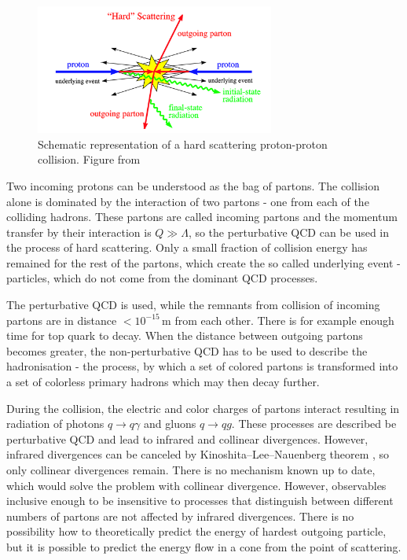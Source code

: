 \begin{figure}[t]
  \centering
  \includegraphics[width=0.7\textwidth]{Chapter2/HardProcess.png}
  \caption{Schematic representation of a hard scattering proton-proton
    collision. Figure from \cite{HardProcess}}
  \label{fig:HardProcess}
\end{figure}

Two incoming protons can be understood as the bag of
partons. The collision alone is dominated by the interaction of two partons - one from
each of the colliding hadrons. These partons are called incoming partons and the
momentum transfer by their interaction is $Q \gg \Lambda$, so the perturbative
QCD can be used in the process of hard scattering. Only a small fraction of
collision energy has remained for the rest of the partons, which create the so
called underlying event - particles, which do not come from
the dominant QCD processes.

The perturbative QCD is used, while the remnants from collision of incoming
partons are in distance $<10^{-15}\,\text{m}$ from each other. There is for
example enough time for top quark to decay. When the distance between outgoing
partons becomes greater, the non-perturbative QCD has to be used to describe the
hadronisation - the process, by which a set of colored partons is
transformed into a set of colorless primary hadrons which may then decay
further. 

During the collision, the electric and color charges of partons interact
resulting in radiation of photons $q \rightarrow q\gamma$ and gluons $q
\rightarrow qg$. These processes are described be perturbative QCD and lead to
infrared and collinear divergences. However, infrared divergences can be
canceled by Kinoshita--Lee--Nauenberg theorem \cite{KLN1,KLN2}, so only
collinear divergences remain. There is no mechanism known up to date, which
would solve the problem with collinear divergence. However, observables
inclusive enough to be insensitive to processes that distinguish between
different numbers of partons are not affected by infrared divergences.
There is no possibility how to theoretically predict the energy of hardest
outgoing particle, but it is possible to predict the energy flow in a cone from
the point of scattering.

